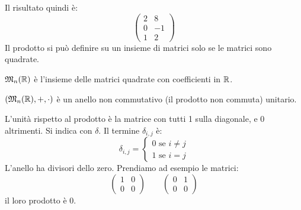 Il risultato quindi \`e:
\[
\begin{pmatrix}
2 & 8 \\
0 & -1 \\
1 & 2
\end{pmatrix}
\]
Il prodotto si pu\`o definire su un insieme di matrici solo se le matrici sono quadrate.

$\mathfrak{M}_n (\mathbb{R})$ \`e l'insieme delle matrici quadrate con coefficienti in $\mathbb{R}$.

$(\mathfrak{M}_n (\mathbb{R}), +, \cdot)$ \`e un anello non commutativo (il prodotto non commuta) unitario.

L'unit\`a rispetto al prodotto \`e la matrice con tutti 1 sulla diagonale, e 0 altrimenti. Si indica con $\delta$. Il termine $\delta_{i, j}$ \`e:
\[
\delta_{i, j} = 
\begin{cases}
0 \text{ se } i \neq j \\
1 \text{ se } i = j
\end{cases}
\]
L'anello ha divisori dello zero. Prendiamo ad esempio le matrici:
\[
\begin{pmatrix}
1 & 0 \\
0 & 0
\end{pmatrix}
\qquad
\begin{pmatrix}
0 & 1 \\
0 & 0
\end{pmatrix}
\]
il loro prodotto \`e 0.

